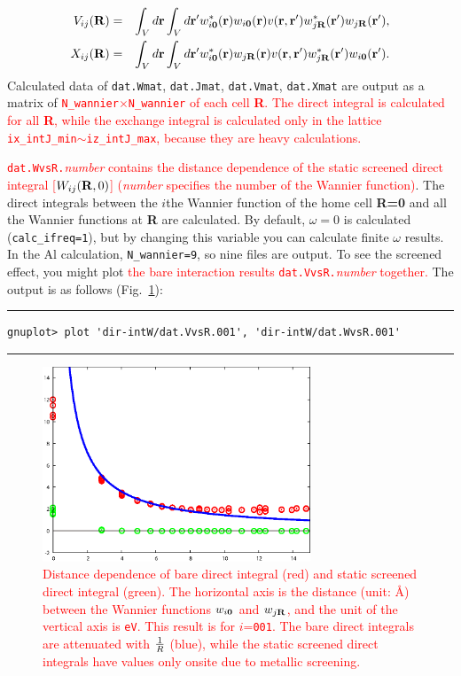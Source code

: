 \documentclass{article}
\newcommand{\tr}[1]{\textcolor{red}{#1}}
\begin{document}
\begin{eqnarray}
V_{ij}({\bf R})&=&\int_V d{\bf r} \int_V  d{\bf r'}
w_{i{\bf 0}}^*({\bf r}) 
w_{i{\bf 0}}({\bf r}) 
v({\bf r,r'}) 
w_{j{\bf R}}^*({\bf r'}) 
w_{j{\bf R}}({\bf r'}), \label{Vij} \\
X_{ij}({\bf R})&=&\int_V  d{\bf r}\int_V d{\bf r'}
w_{i{\bf 0}}^*({\bf r}) 
w_{j{\bf R}}({\bf r}) 
v({\bf r,r'}) 
w_{j{\bf R}}^*({\bf r'}) 
w_{i{\bf 0}}({\bf r'}). \label{Kij}
\end{eqnarray}
Calculated data of \verb+dat.Wmat+, \verb+dat.Jmat+, \verb+dat.Vmat+, \verb+dat.Xmat+ are output as a matrix of \tr{{\tt N\_wannier}$\times${\tt N\_wannier} of each cell {\bf R}. The direct integral is calculated for all {\bf R}, while the exchange integral is calculated only in the lattice {\tt ix\_intJ\_min}$\sim${\tt iz\_intJ\_max}, because they are heavy calculations.} 

\tr{{\tt dat.WvsR.}{\it number} contains the distance dependence of the static screened direct integral [$W_{ij}({\bf R},0)$] ({\it number} specifies the number of the Wannier function)}. The direct integrals between the $i$the Wannier function of the home cell {\bf R=0} and all the Wannier functions at {\bf R} are calculated. By default, $\omega=0$ is calculated (\verb+calc_ifreq=1+), but by changing this variable you can calculate finite $\omega$ results. In the Al calculation, \verb+N_wannier=9+, so nine files are output. To see the screened effect, you might plot \tr{the bare interaction results {\tt dat.VvsR.}{\it number} together.} The output is as follows (Fig.~\ref{WvsR}):
\vspace{3mm}\hrule
\begin{verbatim}
gnuplot> plot 'dir-intW/dat.VvsR.001', 'dir-intW/dat.WvsR.001'  
\end{verbatim}
\hrule\vspace{3mm}
\begin{figure}[H] 
\centering
\includegraphics[width=8cm]{WvsR-Al.eps}
\caption{\tr{Distance dependence of bare direct integral (red) and static screened direct integral (green). The horizontal axis is the distance (unit: \AA) between the Wannier functions $w_{i{\bf 0}}$ and $w_{j{\bf R}}$, and the unit of the vertical axis is {\tt eV}. This result is for $i$={\tt 001}. The bare direct integrals are attenuated with ${\Huge \frac{1}{R}}$ (blue), while the static screened direct integrals have values only onsite due to metallic screening.}}
\label{WvsR}
\end{figure}
\end{document}
